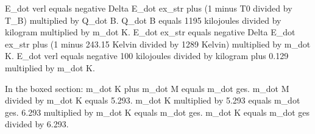 E_dot verl equals negative Delta E_dot ex_str plus (1 minus T0 divided by T_B) multiplied by Q_dot B.  
Q_dot B equals 1195 kilojoules divided by kilogram multiplied by m_dot K.  
E_dot ex_str equals negative Delta E_dot ex_str plus (1 minus 243.15 Kelvin divided by 1289 Kelvin) multiplied by m_dot K.  
E_dot verl equals negative 100 kilojoules divided by kilogram plus 0.129 multiplied by m_dot K.  

In the boxed section:  
m_dot K plus m_dot M equals m_dot ges.  
m_dot M divided by m_dot K equals 5.293.  
m_dot K multiplied by 5.293 equals m_dot ges.  
6.293 multiplied by m_dot K equals m_dot ges.  
m_dot K equals m_dot ges divided by 6.293.